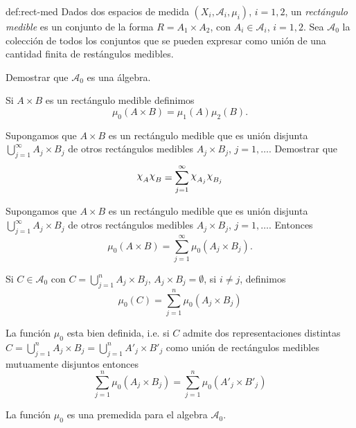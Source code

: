 \begin{definicion}{def:rect-med}
 Dados dos espacios de medida $(X_i,\mathscr{A}_i,\mu_i)$, $i=1,2$, un \emph{rectángulo medible} es un conjunto de la forma $R=A_1\times A_2$, con $A_i\in\mathscr{A}_i$, $i=1,2$. Sea $\mathscr{A}_0$  la colección de todos los conjuntos que se pueden expresar como unión de una cantidad finita de restángulos medibles. 
\end{definicion}

\begin{ejercicio}{} Demostrar que $\mathscr{A}_0$ es una álgebra.
\end{ejercicio}




\begin{definicion}{} Si  $A\times B$ es un rectángulo medible definimos 
\[
 \mu_0(A\times B)=\mu_1(A)\mu_2(B).
\]
\end{definicion}




\begin{ejercicio}{} Supongamos que $A\times B$ es un rectángulo medible que es unión disjunta $\bigcup_{j=1}^{\infty}A_j\times B_j$ de otros rectángulos medibles $A_j\times B_j$, $j=1,\ldots$.  Demostrar que 
\begin{equation}\label{eq:chis_prod}
 \rchi_{A}\rchi_{B}=\sum_{j=1}^{\infty} \rchi_{A_j}\rchi_{B_j} 
\end{equation}

\end{ejercicio}

\begin{proposicion}{} Supongamos que $A\times B$ es un rectángulo medible que es unión disjunta $\bigcup_{j=1}^{\infty}A_j\times B_j$ de otros rectángulos medibles $A_j\times B_j$, $j=1,\ldots$.  Entonces
\begin{equation}\label{eq:chis_prod}
 \mu_0(A\times B)=\sum_{j=1}^{\infty} \mu_0(A_j\times B_j). 
\end{equation}

\end{proposicion}


\begin{definicion}{}
Si $C\in\mathscr{A}_0$ con $C=\bigcup_{j=1}^{n}A_j\times B_j$, $A_j\times B_j=\emptyset$, si $i\neq j$, definimos 
\[
 \mu_0(C)=\sum_{j=1}^{n}\mu_0(A_j\times B_j)
\]

\end{definicion}





\begin{proposicion}{} La función $\mu_0$ esta bien definida, i.e. si $C$ admite dos representaciones distintas   $C=\bigcup_{j=1}^{n}A_j\times B_j=\bigcup_{j=1}^{n}A'_j\times B'_j$ como unión de rectángulos medibles mutuamente disjuntos entonces
 \[
\sum_{j=1}^{n}\mu_0(A_j\times B_j)=\sum_{j=1}^{n}\mu_0(A'_j\times B'_j)
\]
\end{proposicion}

\begin{proposicion}{} La función $\mu_0$ es una premedida para el algebra $\mathscr{A}_0$.
\end{proposicion}
